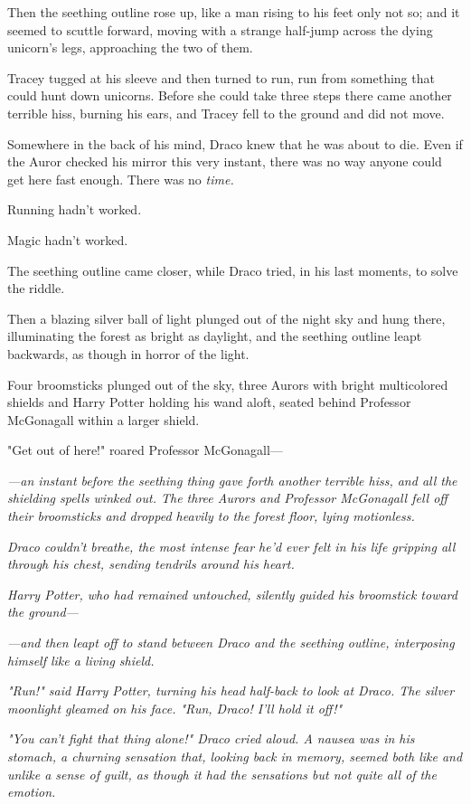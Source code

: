 Then the seething outline rose up, like a man rising to his feet only not so; 
and it seemed to scuttle forward, moving with a strange half-jump across the 
dying unicorn's legs, approaching the two of them.

Tracey tugged at his sleeve and then turned to run, run from something that 
could hunt down unicorns. Before she could take three steps there came another 
terrible hiss, burning his ears, and Tracey fell to the ground and did not move.

Somewhere in the back of his mind, Draco knew that he was about to die. Even if 
the Auror checked his mirror this very instant, there was no way anyone could 
get here fast enough. There was no \emph{time.}

Running hadn't worked.

Magic hadn't worked.

The seething outline came closer, while Draco tried, in his last moments, to 
solve the riddle.

Then a blazing silver ball of light plunged out of the night sky and hung 
there, illuminating the forest as bright as daylight, and the seething outline 
leapt backwards, as though in horror of the light.

Four broomsticks plunged out of the sky, three Aurors with bright multicolored 
shields and Harry Potter holding his wand aloft, seated behind Professor 
McGonagall within a larger shield.

"Get out of here!" roared Professor McGonagall---

\emph{---an instant before the seething thing gave forth another terrible hiss, 
and all the shielding spells winked out. The three Aurors and Professor 
McGonagall fell off their broomsticks and dropped heavily to the forest floor, 
lying motionless.}

\emph{Draco couldn't breathe, the most intense fear he'd ever felt in his life 
gripping all through his chest, sending tendrils around his heart.}

\emph{Harry Potter, who had remained untouched, silently guided his broomstick 
toward the ground---}

\emph{---and then leapt off to stand between Draco and the seething outline, 
interposing himself like a living shield.}

\emph{"Run!" said Harry Potter, turning his head half-back to look at Draco. 
The silver moonlight gleamed on his face. "Run, Draco! I'll hold it off!"}

\emph{"You can't fight that thing alone!" Draco cried aloud. A nausea was in 
his stomach, a churning sensation that, looking back in memory, seemed both 
like and unlike a sense of guilt, as though it had the sensations but not quite 
all of the emotion.}

